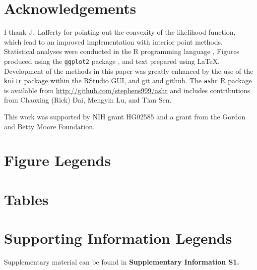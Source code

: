 \documentclass[11pt]{article}
\begin{document}
\section*{Acknowledgements}

I thank J.~Lafferty for pointing out the convexity of the likelihood function, which lead to an improved implementation with interior point methods. 
Statistical analyses were conducted in the {\sf R} programming language \cite{Rcore:2012}, Figures produced using the {\tt ggplot2} package \cite{ggplot2}, and text
prepared using \LaTeX. Development of the methods in this paper was greatly enhanced by the use of the {\tt knitr} package \cite{xie2013dynamic}  within the RStudio GUI, and 
git and github. The {\tt ashr} R package is available from \href{http://github.com/stephens999/ashr}{http://github.com/stephens999/ashr} and includes contributions 
from Chaoxing (Rick) Dai, Mengyin Lu, and Tian Sen. 

This work was supported by NIH grant HG02585 and a grant from the Gordon and Betty Moore Foundation.




\section*{Figure Legends}


\clearpage

\section*{Tables}

\section*{Supporting Information Legends}

Supplementary material can be found in {\bf Supplementary Information S1.}
\end{document}
